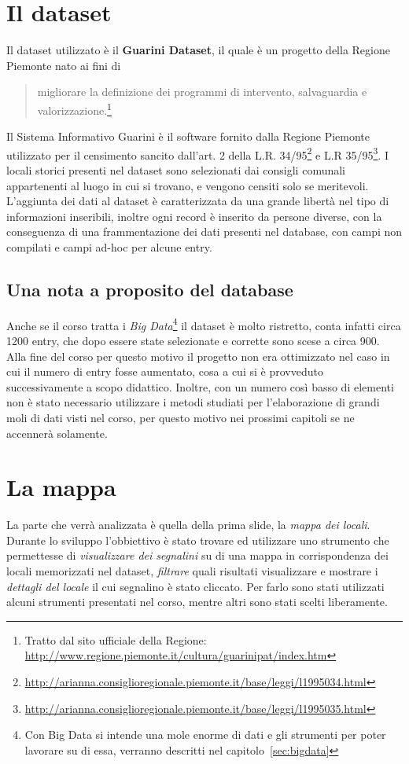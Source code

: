 	\section{Il dataset}
	Il dataset utilizzato è il \textbf{Guarini Dataset}, il quale è un progetto della Regione Piemonte nato ai fini di \begin{quote}%
	migliorare la definizione dei programmi di intervento, salvaguardia e valorizzazione.\footnote{Tratto dal sito ufficiale della Regione: \url{http://www.regione.piemonte.it/cultura/guarinipat/index.htm}}
	\end{quote}%
	Il Sistema Informativo Guarini è il software fornito dalla Regione Piemonte utilizzato per il censimento sancito dall'art. 2 della L.R. 34/95\footnote{\url{http://arianna.consiglioregionale.piemonte.it/base/leggi/l1995034.html}} e L.R 35/95\footnote{\url{http://arianna.consiglioregionale.piemonte.it/base/leggi/l1995035.html}}. I locali storici presenti nel dataset sono selezionati dai consigli comunali appartenenti al luogo in cui si trovano, e vengono censiti solo se meritevoli. L'aggiunta dei dati al dataset è caratterizzata da una grande libertà nel tipo di informazioni inseribili, inoltre ogni record è inserito da persone diverse, con la conseguenza di una frammentazione dei dati presenti nel database, con campi non compilati e campi ad-hoc per alcune entry.
	\subsection{Una nota a proposito del database}
	Anche se il corso tratta i \emph{Big Data}\footnote{Con Big Data si intende una mole enorme di dati e gli strumenti per poter lavorare su di essa, verranno descritti nel capitolo~\ref{sec:bigdata}} il dataset è molto ristretto, conta infatti circa 1200 entry, che dopo essere state selezionate e corrette sono scese a circa 900. Alla fine del corso per questo motivo il progetto non era ottimizzato nel caso in cui il numero di entry fosse aumentato, cosa a cui si è provveduto successivamente a scopo didattico. Inoltre, con un numero così basso di elementi non è stato necessario utilizzare i metodi studiati per l'elaborazione di grandi moli di dati visti nel corso, per questo motivo nei prossimi capitoli se ne accennerà solamente.
	
	
	\section{La mappa}
	La parte che verrà analizzata è quella della prima slide, la \emph{mappa dei locali}. Durante lo sviluppo l'obbiettivo è stato trovare ed utilizzare uno strumento che permettesse di \emph{visualizzare dei segnalini} su di una mappa in corrispondenza dei locali memorizzati nel dataset, \emph{filtrare} quali risultati visualizzare e mostrare i \emph{dettagli del locale} il cui segnalino è stato cliccato.
	Per farlo sono stati utilizzati alcuni strumenti presentati nel corso, mentre altri sono stati scelti liberamente.

